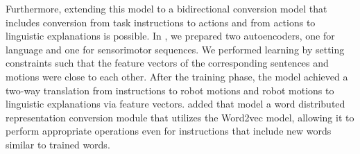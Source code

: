 Furthermore, extending this model to a bidirectional conversion model that includes conversion from task instructions to actions and from actions to linguistic explanations is possible. In \cite{Yamada2018ral}, we prepared two autoencoders, one for language and one for sensorimotor sequences. We performed learning by setting constraints such that the feature vectors of the corresponding sentences and motions were close to each other. After the training phase, the model achieved a two-way translation from instructions to robot motions and robot motions to linguistic explanations via feature vectors. \cite{Toyoda2021ral,Toyoda2022ral} added that model a word distributed representation conversion module that utilizes the Word2vec model, allowing it to perform appropriate operations even for instructions that include new words similar to trained words.


